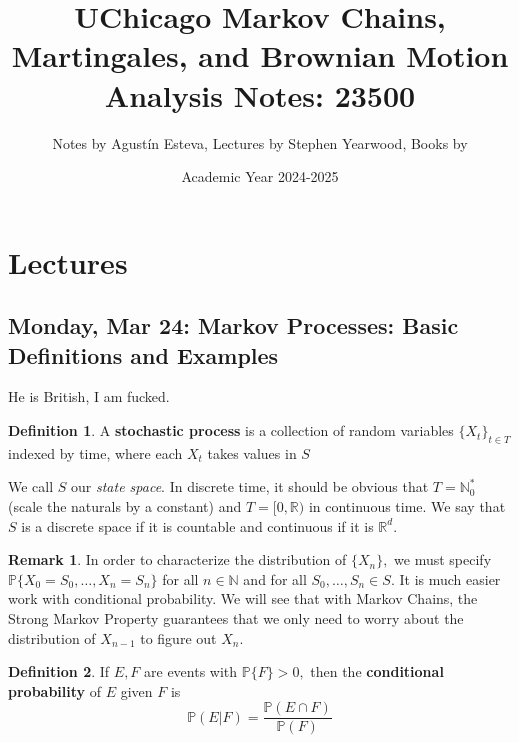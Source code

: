 \documentclass[10pt, oneside]{article}
\title{UChicago Markov Chains, Martingales, and Brownian Motion Analysis Notes: 23500}
\author{Notes by Agustín Esteva, Lectures by Stephen Yearwood, Books by }
\date{Academic Year 2024-2025}
\newcommand{\bbR}{\mathbb{R}}
\newcommand{\bbN}{\mathbb{N}}
\theoremstyle{definition}
\newtheorem{defn}{Definition}
\newtheorem{rem}{Remark}
\begin{document}
\maketitle
\tableofcontents

\vspace{.25in}


\newpage
\section{Lectures}

\subsection{Monday, Mar 24: Markov Processes: Basic Definitions and Examples}
He is British, I am fucked.
\begin{defn}
    A \textbf{stochastic process}  is a collection of random variables $\{X_t\}_{t \in T}$ indexed by time, where each $X_t$ takes values in $S$
\end{defn}
We call $S$ our \textit{state space}. In discrete time, it should be obvious that $T = \bbN_0^*$ (scale the naturals by a constant) and $T = [0, \bbR)$ in continuous time. We say that $S$ is a discrete space if it is countable and continuous if it is $\bbR^d.$
\begin{rem}
    In order to characterize the distribution of $\{X_n\},$ we must specify $\mathbb{P}\{X_0 = S_0, \dots, X_n = S_n\}$ for all $n \in \bbN$ and for all $S_0, \dots, S_n \in S.$ It is much easier work with conditional probability. We will see that with Markov Chains, the Strong Markov Property guarantees that we only need to worry about the distribution of $X_{n-1}$ to figure out $X_n.$
\end{rem}
\begin{defn}
    If $E,F$ are events with $\mathbb{P}\{F\} >0,$ then the \textbf{conditional probability} of $E$ given $F$ is 
    \[\mathbb{P}(E | F) = \frac{\mathbb{P}(E \cap F)}{\mathbb{P}(F)}\]
\end{defn}
\end{document}
